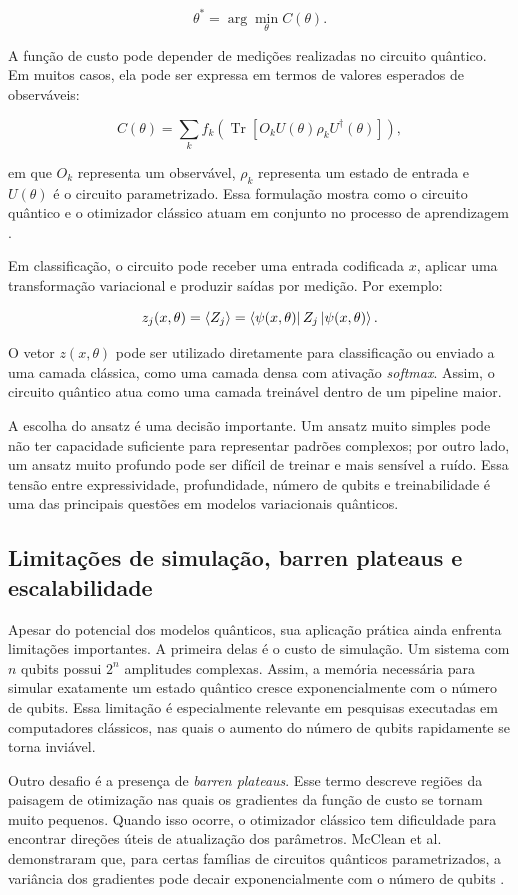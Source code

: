 \documentclass[
    12pt,
    openright,
    oneside,
    a4paper,
    english,
    brazil
]{abntex2}
\begin{document}
\[
\theta^* =
\arg\min_{\theta}
C(\theta).
\]

A função de custo pode depender de medições realizadas no circuito quântico. Em muitos casos, ela pode ser expressa em termos de valores esperados de observáveis:

\[
C(\theta)
=
\sum_k
f_k
\left(
\operatorname{Tr}
[
O_k U(\theta)\rho_k U^\dagger(\theta)
]
\right),
\]

em que \(O_k\) representa um observável, \(\rho_k\) representa um estado de entrada e \(U(\theta)\) é o circuito parametrizado. Essa formulação mostra como o circuito quântico e o otimizador clássico atuam em conjunto no processo de aprendizagem \cite{cerezo2021variational}.

Em classificação, o circuito pode receber uma entrada codificada \(x\), aplicar uma transformação variacional e produzir saídas por medição. Por exemplo:

\[
z_j(x,\theta)
=
\langle Z_j \rangle
=
\bra{\psi(x,\theta)}
Z_j
\ket{\psi(x,\theta)}.
\]

O vetor \(z(x,\theta)\) pode ser utilizado diretamente para classificação ou enviado a uma camada clássica, como uma camada densa com ativação \textit{softmax}. Assim, o circuito quântico atua como uma camada treinável dentro de um pipeline maior.

A escolha do ansatz é uma decisão importante. Um ansatz muito simples pode não ter capacidade suficiente para representar padrões complexos; por outro lado, um ansatz muito profundo pode ser difícil de treinar e mais sensível a ruído. Essa tensão entre expressividade, profundidade, número de qubits e treinabilidade é uma das principais questões em modelos variacionais quânticos.

\subsection{Limitações de simulação, barren plateaus e escalabilidade}

Apesar do potencial dos modelos quânticos, sua aplicação prática ainda enfrenta limitações importantes. A primeira delas é o custo de simulação. Um sistema com \(n\) qubits possui \(2^n\) amplitudes complexas. Assim, a memória necessária para simular exatamente um estado quântico cresce exponencialmente com o número de qubits. Essa limitação é especialmente relevante em pesquisas executadas em computadores clássicos, nas quais o aumento do número de qubits rapidamente se torna inviável.

Outro desafio é a presença de \textit{barren plateaus}. Esse termo descreve regiões da paisagem de otimização nas quais os gradientes da função de custo se tornam muito pequenos. Quando isso ocorre, o otimizador clássico tem dificuldade para encontrar direções úteis de atualização dos parâmetros. McClean et al. demonstraram que, para certas famílias de circuitos quânticos parametrizados, a variância dos gradientes pode decair exponencialmente com o número de qubits \cite{mcclean2018barren}.
\end{document}
